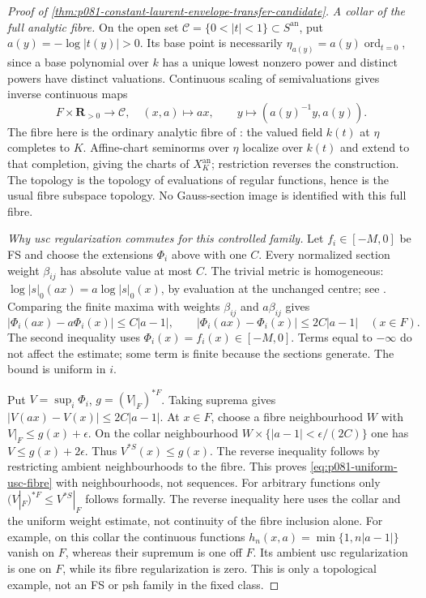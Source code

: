 \begin{proof}[Proof of \cref{thm:p081-constant-laurent-envelope-transfer-candidate}]
\emph{A collar of the full analytic fibre.}
On the open set \(\mathcal C=\{0<|t|<1\}\subset S^{\mathrm{an}}\),
put \(a(y)=-\log|t(y)|>0\). Its base point is necessarily
\(\eta_{a(y)}=a(y)\operatorname{ord}_{t=0}\), since a base polynomial
over \(k\) has a unique lowest nonzero power and distinct powers have
distinct valuations. Continuous scaling of semivaluations
\cite[\S1.1.4]{BJ22} gives inverse continuous maps
\begin{equation}\label{eq:p081-uniform-collar}
 F\times\mathbf R_{>0}\longrightarrow\mathcal C,
 \quad(x,a)\longmapsto ax,
 \qquad y\longmapsto(a(y)^{-1}y,a(y)).
\end{equation}
The fibre here is the ordinary analytic fibre of
\cite[Definition/Exercise~4.1.7.1]{Temkin2011}: the valued field
\(k(t)\) at \(\eta\) completes to \(K\). Affine-chart seminorms
over \(\eta\) localize over \(k(t)\) and extend to that completion,
giving the charts of \(X_K^{\mathrm{an}}\); restriction reverses the
construction. The topology is the topology of evaluations of regular
functions, hence is the usual fibre subspace topology. No Gauss-section
image is identified with this full fibre.

\emph{Why usc regularization commutes for this controlled family.}
Let \(f_i\in[-M,0]\) be FS and choose the extensions \(\Phi_i\)
above with one \(C\). Every normalized section weight \(\beta_{ij}\)
has absolute value at most \(C\). The trivial metric is homogeneous:
\(\log|s|_0(ax)=a\log|s|_0(x)\), by evaluation at the unchanged
centre; see \cite[Remark~1.24 and \S1.1.4]{BJ22}. Comparing the finite
maxima with weights \(\beta_{ij}\) and \(a\beta_{ij}\) gives
\[
 |\Phi_i(ax)-a\Phi_i(x)|\leq C|a-1|,
 \qquad |\Phi_i(ax)-\Phi_i(x)|\leq2C|a-1|\quad(x\in F).
\]
The second inequality uses \(\Phi_i(x)=f_i(x)\in[-M,0]\).
Terms equal to \(-\infty\) do not affect the estimate; some term is
finite because the sections generate. The bound is uniform in \(i\).

Put \(V=\sup_i\Phi_i\), \(g=(V|_F)^{*F}\). Taking suprema gives
\(|V(ax)-V(x)|\leq2C|a-1|\). At \(x\in F\), choose a fibre
neighbourhood \(W\) with \(V|_F\leq g(x)+\epsilon\). On the collar
neighbourhood \(W\times\{|a-1|<\epsilon/(2C)\}\) one has
\(V\leq g(x)+2\epsilon\). Thus \(V^{*S}(x)\leq g(x)\). The
reverse inequality follows by restricting ambient neighbourhoods to the
fibre. This proves \eqref{eq:p081-uniform-usc-fibre} with neighbourhoods,
not sequences. For arbitrary functions only
\((V|_F)^{*F}\leq V^{*S}|_F\) follows formally. The reverse inequality
here uses the collar and the uniform weight estimate, not continuity of
the fibre inclusion alone. For example, on this collar the continuous
functions \(h_n(x,a)=\min\{1,n|a-1|\}\) vanish on \(F\), whereas
their supremum is one off \(F\). Its ambient usc regularization is one
on \(F\), while its fibre regularization is zero. This is only a
topological example, not an FS or psh family in the fixed class.


\end{proof}
